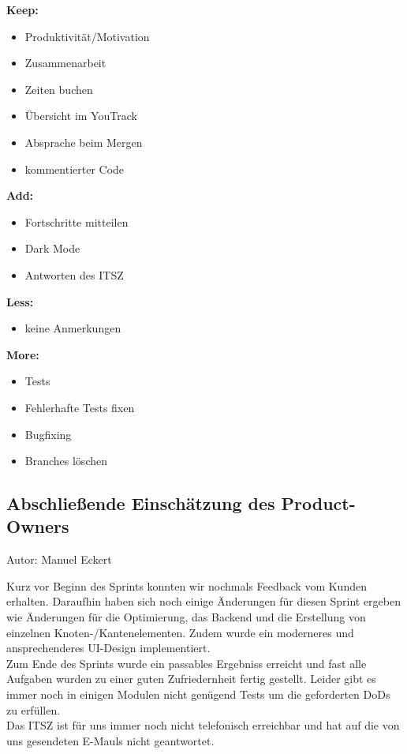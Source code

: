 \textbf{Keep:}
\begin{itemize}
\item Produktivität/Motivation
\item Zusammenarbeit 
\item Zeiten buchen
\item Übersicht im YouTrack
\item Absprache beim Mergen
\item kommentierter Code
\end{itemize}

\textbf{Add:}
\begin{itemize}
\item Fortschritte mitteilen
\item Dark Mode
\item Antworten des ITSZ
\end{itemize}

\textbf{Less:}
\begin{itemize}
\item keine Anmerkungen
\end{itemize}

\textbf{More:}
\begin{itemize}
\item Tests
\item Fehlerhafte Tests fixen
\item Bugfixing
\item Branches löschen
\end{itemize}


\subsection{Abschließende Einschätzung des Product-Owners}
{\small Autor: Manuel Eckert}

Kurz vor Beginn des Sprints konnten wir nochmals Feedback vom Kunden erhalten. Daraufhin haben sich noch einige Änderungen für diesen Sprint ergeben wie Änderungen für die Optimierung, das Backend und die Erstellung von einzelnen Knoten-/Kantenelementen. Zudem wurde ein moderneres und ansprechenderes UI-Design implementiert. \\
Zum Ende des Sprints wurde ein passables Ergebniss erreicht und fast alle Aufgaben wurden zu einer guten Zufriedernheit fertig gestellt. 
Leider gibt es immer noch in einigen Modulen nicht genügend Tests um die geforderten DoDs zu erfüllen. \\
Das ITSZ ist für uns immer noch nicht telefonisch erreichbar und hat auf die von uns gesendeten E-Mauls nicht geantwortet. 

